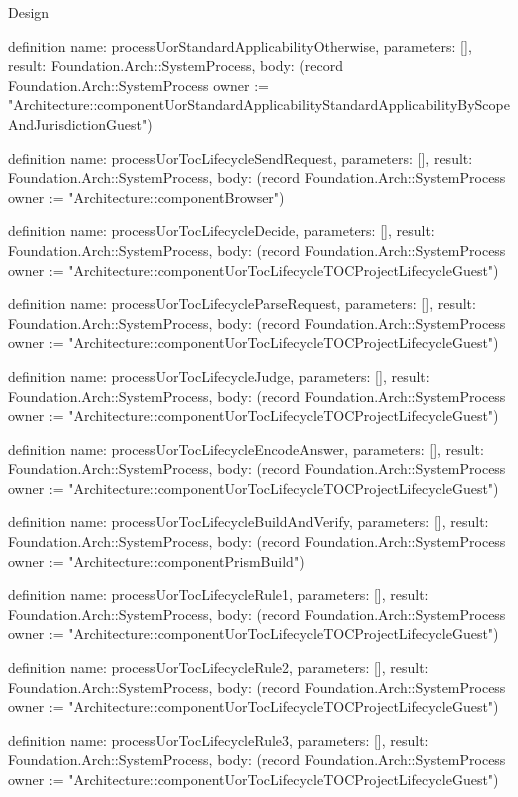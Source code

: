 \begin{lexlean}{Design}
\begin{semanticmodule}
definition{
  name: processUorStandardApplicabilityOtherwise,
  parameters: [],
  result: Foundation.Arch::SystemProcess,
  body: (record Foundation.Arch::SystemProcess {owner := "Architecture::componentUorStandardApplicabilityStandardApplicabilityByScopeAndJurisdictionGuest"})
}

definition{
  name: processUorTocLifecycleSendRequest,
  parameters: [],
  result: Foundation.Arch::SystemProcess,
  body: (record Foundation.Arch::SystemProcess {owner := "Architecture::componentBrowser"})
}

definition{
  name: processUorTocLifecycleDecide,
  parameters: [],
  result: Foundation.Arch::SystemProcess,
  body: (record Foundation.Arch::SystemProcess {owner := "Architecture::componentUorTocLifecycleTOCProjectLifecycleGuest"})
}

definition{
  name: processUorTocLifecycleParseRequest,
  parameters: [],
  result: Foundation.Arch::SystemProcess,
  body: (record Foundation.Arch::SystemProcess {owner := "Architecture::componentUorTocLifecycleTOCProjectLifecycleGuest"})
}

definition{
  name: processUorTocLifecycleJudge,
  parameters: [],
  result: Foundation.Arch::SystemProcess,
  body: (record Foundation.Arch::SystemProcess {owner := "Architecture::componentUorTocLifecycleTOCProjectLifecycleGuest"})
}

definition{
  name: processUorTocLifecycleEncodeAnswer,
  parameters: [],
  result: Foundation.Arch::SystemProcess,
  body: (record Foundation.Arch::SystemProcess {owner := "Architecture::componentUorTocLifecycleTOCProjectLifecycleGuest"})
}

definition{
  name: processUorTocLifecycleBuildAndVerify,
  parameters: [],
  result: Foundation.Arch::SystemProcess,
  body: (record Foundation.Arch::SystemProcess {owner := "Architecture::componentPrismBuild"})
}

definition{
  name: processUorTocLifecycleRule1,
  parameters: [],
  result: Foundation.Arch::SystemProcess,
  body: (record Foundation.Arch::SystemProcess {owner := "Architecture::componentUorTocLifecycleTOCProjectLifecycleGuest"})
}

definition{
  name: processUorTocLifecycleRule2,
  parameters: [],
  result: Foundation.Arch::SystemProcess,
  body: (record Foundation.Arch::SystemProcess {owner := "Architecture::componentUorTocLifecycleTOCProjectLifecycleGuest"})
}

definition{
  name: processUorTocLifecycleRule3,
  parameters: [],
  result: Foundation.Arch::SystemProcess,
  body: (record Foundation.Arch::SystemProcess {owner := "Architecture::componentUorTocLifecycleTOCProjectLifecycleGuest"})
}


\end{semanticmodule}
\end{lexlean}
